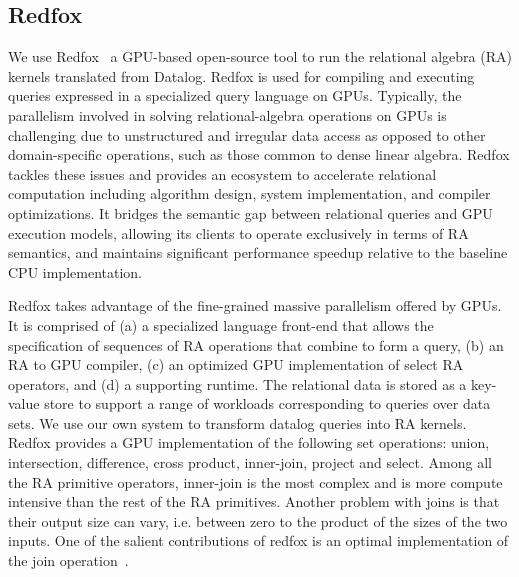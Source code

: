 \subsection{Redfox}
We use Redfox~\cite{Wu:2014:RFE:2581122.2544166} a GPU-based open-source tool to run the relational algebra (RA) kernels translated from Datalog.
Redfox is used for compiling and executing queries expressed in a specialized query language on GPUs.
Typically, the parallelism involved in solving relational-algebra operations on GPUs is challenging due to 
unstructured and irregular data access as opposed to other domain-specific operations, such as those
common to dense linear algebra. 
Redfox tackles these issues and provides an ecosystem to accelerate relational computation including
algorithm design, system implementation, and compiler optimizations. It bridges the semantic gap 
between relational queries and GPU execution models, allowing its clients to operate exclusively in terms of
RA semantics, and maintains significant performance speedup relative to the baseline CPU implementation. 

Redfox takes advantage of the fine-grained massive parallelism offered by GPUs.
It is comprised of (a) a specialized language front-end that allows the specification of sequences of RA operations
that combine to form a query, 
(b) an RA to GPU compiler, (c) an optimized GPU implementation of select RA operators, and (d) a supporting runtime.
The relational data is stored as a key-value store to support a range of workloads corresponding to queries over data
sets. We use our own system to transform datalog queries into RA kernels. Redfox provides a GPU implementation of
the following set operations:  union, intersection, difference, cross product, inner-join, project and select. Among all
the RA primitive operators,
inner-join is the most complex and is more compute intensive than the rest of the RA primitives. Another 
problem with joins is that their output size can vary, i.e. between zero to the product of the sizes of the two inputs.
One of the salient contributions of redfox is an optimal implementation of the join operation~\cite{wu_adms14}.

